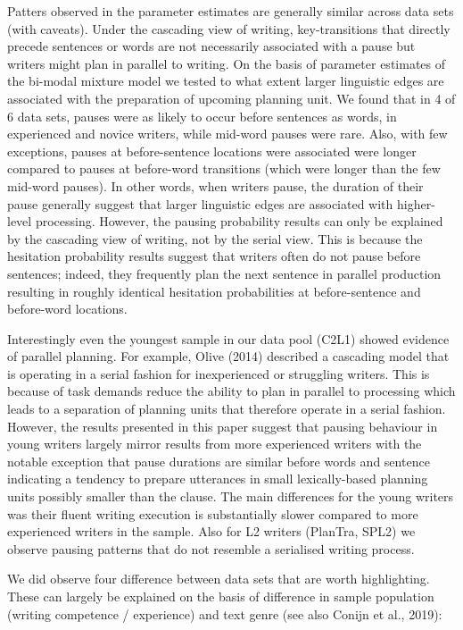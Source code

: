 \documentclass[
  english,
  man,floatsintext]{apa7}
\begin{document}
Patters observed in the parameter estimates are generally similar across data sets (with caveats). Under the cascading view of writing, key-transitions that directly precede sentences or words are not necessarily associated with a pause but writers might plan in parallel to writing. On the basis of parameter estimates of the bi-modal mixture model we tested to what extent larger linguistic edges are associated with the preparation of upcoming planning unit. We found that in 4 of 6 data sets, pauses were as likely to occur before sentences as words, in experienced and novice writers, while mid-word pauses were rare. Also, with few exceptions, pauses at before-sentence locations were associated were longer compared to pauses at before-word transitions (which were longer than the few mid-word pauses). In other words, when writers pause, the duration of their pause generally suggest that larger linguistic edges are associated with higher-level processing. However, the pausing probability results can only be explained by the cascading view of writing, not by the serial view. This is because the hesitation probability results suggest that writers often do not pause before sentences; indeed, they frequently plan the next sentence in parallel production resulting in roughly identical hesitation probabilities at before-sentence and before-word locations.

Interestingly even the youngest sample in our data pool (C2L1) showed evidence of parallel planning. For example, Olive (2014) described a cascading model that is operating in a serial fashion for inexperienced or struggling writers. This is because of task demands reduce the ability to plan in parallel to processing which leads to a separation of planning units that therefore operate in a serial fashion. However, the results presented in this paper suggest that pausing behaviour in young writers largely mirror results from more experienced writers with the notable exception that pause durations are similar before words and sentence indicating a tendency to prepare utterances in small lexically-based planning units possibly smaller than the clause. The main differences for the young writers was their fluent writing execution is substantially slower compared to more experienced writers in the sample. Also for L2 writers (PlanTra, SPL2) we observe pausing patterns that do not resemble a serialised writing process.

We did observe four difference between data sets that are worth highlighting. These can largely be explained on the basis of difference in sample population (writing competence / experience) and text genre (see also Conijn et al., 2019):
\end{document}
